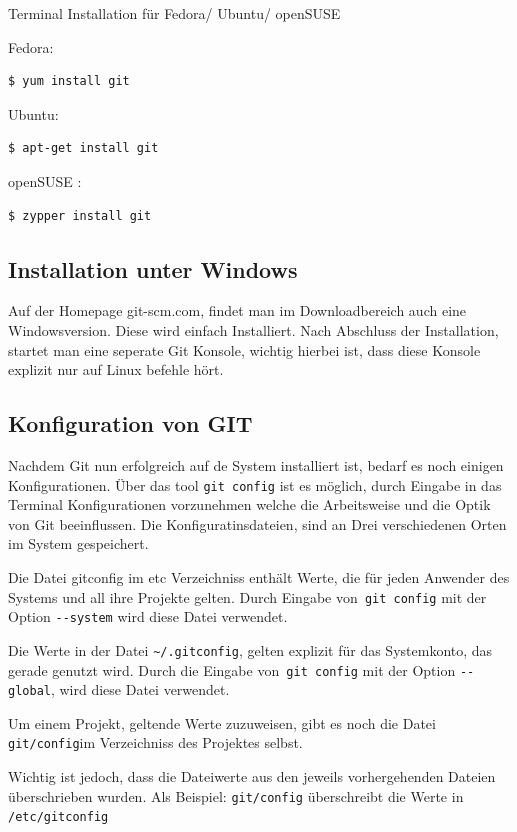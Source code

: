 \documentclass[12pt,a4paper,bibliography=totocnumbered,listof=totocnumbered]{scrartcl}
\begin{document}
Terminal Installation für Fedora/ Ubuntu/ openSUSE 

Fedora:
\begin{lstlisting}
$ yum install git
 \end{lstlisting}

Ubuntu:
\begin{lstlisting}
$ apt-get install git
 \end{lstlisting}

openSUSE :
\begin{lstlisting}
$ zypper install git
 \end{lstlisting}



\subsection{Installation unter Windows}
Auf der Homepage git-scm.com, findet man im Downloadbereich auch eine Windowsversion.
Diese wird einfach Installiert. Nach Abschluss der Installation, startet man eine seperate Git Konsole, wichtig hierbei ist, dass diese Konsole explizit nur auf Linux befehle hört. 

\subsection{Konfiguration von GIT}
Nachdem Git nun erfolgreich auf de System installiert ist, bedarf es noch einigen Konfigurationen. Über das tool \lstinline|git config| ist es möglich, durch Eingabe in das Terminal Konfigurationen vorzunehmen welche die Arbeitsweise und die Optik von Git beeinflussen. Die Konfiguratinsdateien, sind an Drei verschiedenen Orten im System
gespeichert. 
\begin{compactitem}
	\item Die Datei gitconfig im etc Verzeichniss enthält Werte, die für jeden Anwender des Systems und all ihre Projekte gelten. Durch Eingabe von\lstinline| git config| mit der Option \lstinline|--system| wird diese Datei verwendet.
\item Die Werte in der Datei \lstinline|~/.gitconfig|, gelten explizit für das Systemkonto, das gerade genutzt wird. Durch die Eingabe von\lstinline| git config| mit der Option \lstinline|--global|, wird diese Datei verwendet. 
\item Um einem Projekt, geltende Werte zuzuweisen, gibt es noch die Datei \lstinline|git/config|im Verzeichniss des Projektes selbst. 
\end{compactitem}
Wichtig ist jedoch, dass die Dateiwerte aus den jeweils vorhergehenden Dateien überschrieben wurden. Als Beispiel: \lstinline|git/config| überschreibt die Werte in \lstinline|/etc/gitconfig|
\end{document}
